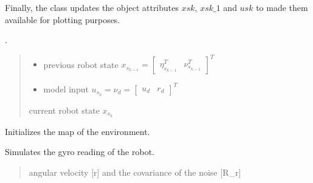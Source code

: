 \documentclass[letterpaper,10pt,english]{sphinxmanual}
\begin{document}
\begin{fulllineitems}
\begin{fulllineitems}
\sphinxAtStartPar
Finally, the class updates the object attributes \(xsk\), \(xsk\_1\) and  \(usk\) to made them available for plotting purposes.

\sphinxAtStartPar
{}.
\begin{quote}\begin{description}
\begin{itemize}
\item {} 
\sphinxAtStartPar
{} \textendash{} previous robot state \(x_{s_{k-1}}=\begin{bmatrix}\eta_{s_{k-1}}^T & \nu_{s_{k-1}}^T\end{bmatrix}^T\)

\item {} 
\sphinxAtStartPar
{} \textendash{} model input \(u_{s_k}=\nu_{d}=\begin{bmatrix} u_d& r_d\end{bmatrix}^T\)

\end{itemize}

\sphinxAtStartPar
current robot state \(x_{s_k}\)

\end{description}\end{quote}

\end{fulllineitems}


\begin{fulllineitems}
\label{\detokenize{robot_simulation:AUV4DOFSimulatedRobot.AUV4DOFSimulatedRobot.SetMap}}
\pysigstartsignatures
{}
\pysigstopsignatures
\sphinxAtStartPar
Initializes the map of the environment.

\end{fulllineitems}


\begin{fulllineitems}
\label{\detokenize{robot_simulation:AUV4DOFSimulatedRobot.AUV4DOFSimulatedRobot.ReadGyro}}
\pysigstartsignatures
{}
\pysigstopsignatures
\sphinxAtStartPar
Simulates the gyro reading of the robot.
\begin{quote}\begin{description}
\sphinxAtStartPar
angular velocity {[}r{]} and the covariance of the noise {[}R\_r{]}


\end{description}
\end{quote}
\end{fulllineitems}
\end{fulllineitems}
\end{document}
